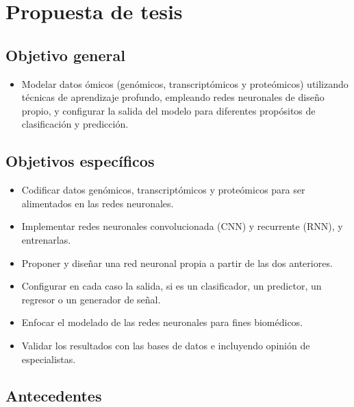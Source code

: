 \section{Propuesta de tesis}

\subsection{Objetivo general}

\begin{itemize}

   \addtolength{\itemsep}{-4mm} %
        \item Modelar datos ómicos (genómicos, transcriptómicos y proteómicos) utilizando técnicas de aprendizaje profundo, empleando redes neuronales de diseño propio, y configurar la salida del modelo para diferentes propósitos de clasificación y predicción.

    \end{itemize}



\subsection{Objetivos específicos}

\begin{itemize}

   \addtolength{\itemsep}{-4mm} %
        \item Codificar datos genómicos, transcriptómicos y proteómicos para ser alimentados en las redes neuronales.
        \item Implementar redes neuronales convolucionada (CNN) y recurrente (RNN), y entrenarlas.
        \item Proponer y diseñar una red neuronal propia a partir de las dos anteriores.
        \item Configurar en cada caso la salida, si es un clasificador, un predictor, un regresor o un generador de señal.
        \item Enfocar el modelado de las redes neuronales para fines biomédicos.
        \item Validar los resultados con las bases de datos e incluyendo opinión de especialistas.
    \end{itemize}

\subsection{Antecedentes}

